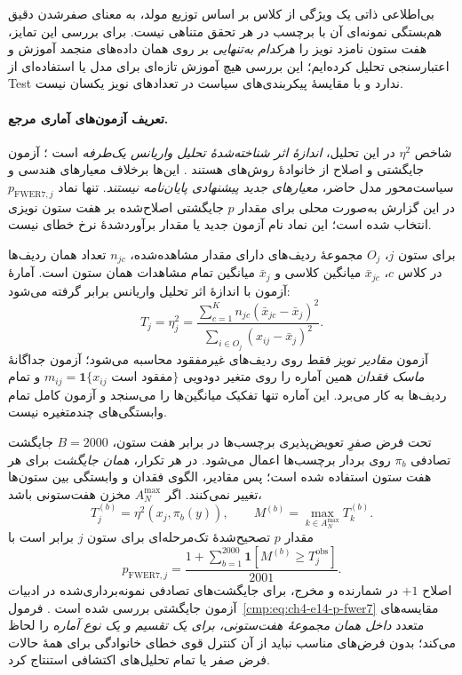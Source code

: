 بی‌اطلاعی ذاتی یک ویژگی از کلاس
بر اساس توزیع مولد،
به معنای صفرشدن دقیق
هم‌بستگی نمونه‌ای آن
با برچسب در هر تحقق متناهی نیست.
برای بررسی این تمایز،
هفت ستون نامزد نویز را
\emph{هرکدام به‌تنهایی}
بر روی همان داده‌های منجمد
آموزش و اعتبارسنجی
تحلیل کرده‌ایم؛
این بررسی هیچ آموزش
تازه‌ای برای مدل
یا استفاده‌ای از Test ندارد
و با مقایسهٔ پیکربندی‌های
سیاست در تعدادهای نویز
یکسان نیست.
\paragraph{تعریف آزمون‌های آماری مرجع.}
شاخص $\eta^2$ در این تحلیل،
\emph{اندازهٔ اثر شناخته‌شدهٔ
تحلیل واریانس یک‌طرفه}
است \cite{Richardson2011EtaSquared}؛
آزمون جایگشتی و اصلاح
از خانوادهٔ روش‌های
هستند
\cite{WestfallYoung1993Resampling}.
این‌ها برخلاف معیارهای
هندسی و سیاست‌محور
مدل حاضر،
\emph{معیارهای جدید پیشنهادی
پایان‌نامه نیستند}.
تنها نماد
$p_{\mathrm{FWER7},j}$
در این گزارش به‌صورت
محلی برای مقدار
$p$ جایگشتی اصلاح‌شده
بر هفت ستون نویزی
انتخاب شده است؛
این نماد نام آزمون
جدید یا مقدار برآوردشدهٔ
نرخ خطای  نیست.

برای ستون $j$،
$O_j$ مجموعهٔ ردیف‌های
دارای مقدار مشاهده‌شده،
$n_{jc}$ تعداد همان
ردیف‌ها در کلاس $c$،
$\bar x_{jc}$ میانگین کلاسی
و $\bar x_j$ میانگین
تمام مشاهدات همان ستون است.
آمارهٔ آزمون با
اندازهٔ اثر تحلیل واریانس
برابر گرفته می‌شود:
\begin{equation}
\label{eq:ch4-e14-eta2}
T_j=\eta_j^2=
\frac{\sum_{c=1}^{K}
n_{jc}(\bar x_{jc}-\bar x_j)^2}
{\sum_{i\in O_j}
(x_{ij}-\bar x_j)^2}.
\end{equation}
آزمون \emph{مقادیر نویز}
فقط روی ردیف‌های
غیرمفقود محاسبه می‌شود؛
آزمون جداگانهٔ
\emph{ماسک فقدان}
همین آماره را روی
متغیر دودویی
$m_{ij}=\mathbf{1}
\{x_{ij}\text{ مفقود است}\}$
و تمام ردیف‌ها
به کار می‌برد.
این آماره تنها
تفکیک میانگین‌ها
را می‌سنجد
و آزمون کامل
تمام وابستگی‌های
چندمتغیره نیست.

تحت فرض صفرِ
تعویض‌پذیری برچسب‌ها
در برابر هفت ستون،
$B=2000$ جایگشت
تصادفی $\pi_b$
روی بردار برچسب‌ها
اعمال می‌شود.
در هر تکرار،
\emph{همان جایگشت}
برای هر هفت ستون
استفاده شده است؛
پس مقادیر،
الگوی فقدان
و وابستگی بین
ستون‌ها تغییر نمی‌کنند.
اگر
$A_N^{\max}$
مخزن هفت‌ستونی باشد،
\begin{equation}
\label{eq:ch4-e14-maxt}
T_j^{(b)}
=\eta^2(x_j,\pi_b(y)),
\qquad
M^{(b)}
=\max_{k\in A_N^{\max}}
T_k^{(b)}.
\end{equation}
مقدار $p$ تصحیح‌شدهٔ
تک‌مرحله‌ای برای ستون $j$
برابر است با
\begin{equation}
\label{eq:ch4-e14-p-fwer7}
p_{\mathrm{FWER7},j}
=\frac{
1+\sum_{b=1}^{2000}
\mathbf{1}
\left[M^{(b)}\ge
T_j^{\mathrm{obs}}\right]
}{2001}.
\end{equation}
اصلاح $+1$ در شمارنده
و مخرج،
برای جایگشت‌های
تصادفی نمونه‌برداری‌شده
در ادبیات آزمون جایگشتی
بررسی شده است
\cite{PhipsonSmyth2010Permutation}.
فرمول~\eqref{cmp:eq:ch4-e14-p-fwer7}
مقایسه‌های متعدد
\emph{داخل همان مجموعهٔ
هفت‌ستونی،
برای یک تقسیم و
یک نوع آماره}
را لحاظ می‌کند؛
بدون فرض‌های مناسب
نباید از آن
کنترل قوی خطای
خانوادگی برای
همهٔ حالات فرض صفر
یا تمام تحلیل‌های
اکتشافی استنتاج کرد.

